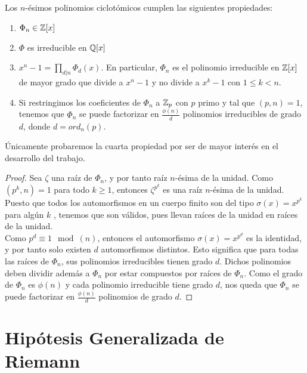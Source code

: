 \begin{proposicion}
	Los $n$-ésimos polinomios ciclotómicos cumplen las siguientes propiedades:
	
	\begin{enumerate}
		\item $\Phi_n \in \mathbb{Z}[x]$
		
		\item $\Phi$ es irreducible en $\mathbb{Q}[x]$
		
		\item $x^n - 1 = \prod_{d|n}\Phi_d(x)$. En particular, $\Phi_n$ es el polinomio irreducible en $\mathbb{Z}[x]$ de mayor grado que divide a $x^n - 1$ y no divide a $x^k - 1$ con $1 \leq k < n$.
		
		\item Si restringimos los coeficientes de $\Phi_n$ a $\mathbb{Z}_p$ con $p$ primo y tal que $(p, n) = 1$, tenemos que $\Phi_n$ se puede factorizar en $\frac{\phi(n)}{d}$ polinomios irreducibles de grado $d$, donde $d = ord_n(p)$.
	\end{enumerate}
\end{proposicion}

Únicamente probaremos la cuarta propiedad por ser de mayor interés en el desarrollo del trabajo.

\begin{proof}
	Sea $\zeta$ una raíz de $\Phi_n$, y por tanto raíz $n$-ésima de la unidad. Como $(p^k, n) = 1$ para todo $k \geq 1$, entonces $\zeta^{p^k}$ es una raíz $n$-ésima de la unidad. Puesto que todos los automorfismos en un cuerpo finito son del tipo $\sigma(x) = x^{p^k}$ para algún $k$ \cite{mullen_panario_2013}, tenemos que son válidos, pues llevan raíces de la unidad en raíces de la unidad.\\
	
	Como $p^d \equiv 1 \mod(n)$, entonces el automorfismo $\sigma(x) = x^{p^d}$ es la identidad, y por tanto solo existen $d$ automorfismos distintos. Esto significa que para todas las raíces de $\Phi_n$, sus polinomios irreducibles tienen grado $d$. Dichos polinomios deben dividir además a $\Phi_n$ por estar compuestos por raíces de $\Phi_n$. Como el grado de $\Phi_n$ es $\phi(n)$ y cada polinomio irreducible tiene grado $d$, nos queda que $\Phi_n$ se puede factorizar en $\frac{\phi(n)}{d}$ polinomios de grado $d$.
\end{proof}

\section{Hipótesis Generalizada de Riemann}

